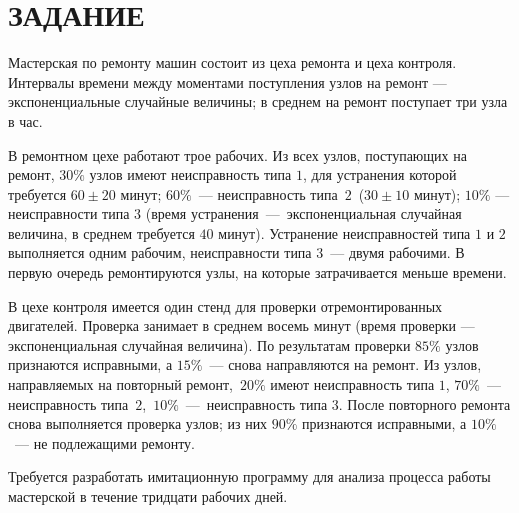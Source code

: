 \section*{ЗАДАНИЕ}

Мастерская по ремонту машин состоит из цеха ремонта и цеха контроля. Интервалы
времени между моментами поступления узлов на ремонт --- экспоненциальные случайные
величины; в среднем на ремонт поступает три узла в час.

В ремонтном цехе работают трое рабочих. Из всех узлов, поступающих на ремонт,
$ 30\% $ узлов имеют неисправность типа $1$, для устранения которой требуется
$ 60 \pm 20$ минут; $ 60\% $~--- неисправность типа~$2$~($ 30 \pm 10 $ минут);
$ 10\% $ --- неисправности типа $3$ (время устранения~---~экспоненциальная случайная
величина, в среднем требуется $40$ минут). Устранение неисправностей типа $1$ и $2$
выполняется одним рабочим, неисправности типа $3$~--- двумя рабочими. В первую
очередь ремонтируются узлы, на которые затрачивается меньше времени.

В цехе контроля имеется один стенд для проверки отремонтированных двигателей.
Проверка занимает в среднем восемь минут (время проверки --- экспоненциальная
случайная величина). По результатам проверки $85\%$ узлов признаются исправными,
а $15\%$~--- снова направляются на ремонт. Из узлов, направляемых на повторный
ремонт,~$20\%$ имеют неисправность типа $1$, $70\%$~--- неисправность
типа~$2$,~$10\%$~---~неисправность типа 3. После повторного ремонта снова выполняется
проверка узлов; из них $90\%$ признаются исправными, а $10\%$~--- не подлежащими
ремонту.

Требуется разработать имитационную программу для анализа процесса работы мастерской
в течение тридцати рабочих дней.

\pagebreak
